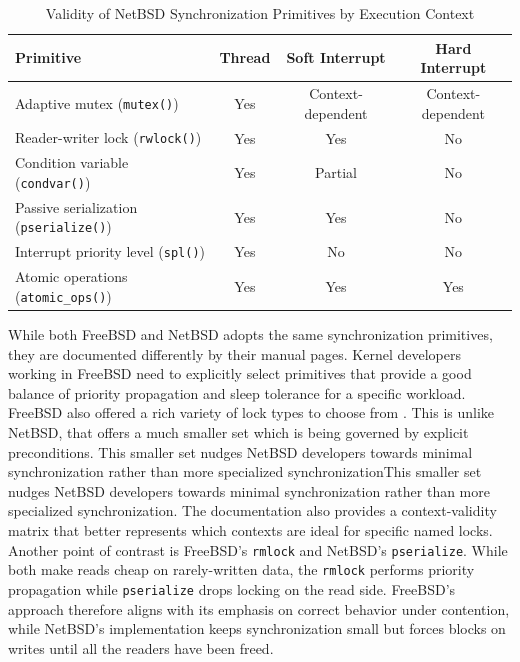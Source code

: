 \begin{table}[!htb]
	\centering
	\begin{tabular}{|p{}|c|c|c|}
		\hline
		\textbf{Primitive}                            & \textbf{Thread} & \textbf{Soft Interrupt} & \textbf{Hard Interrupt} \\
		\hline\hline
		Adaptive mutex (\texttt{mutex()})             & Yes             & Context-dependent       & Context-dependent       \\ \hline
		Reader-writer lock (\texttt{rwlock()})        & Yes             & Yes                     & No                      \\ \hline
		Condition variable (\texttt{condvar()})       & Yes             & Partial                 & No                      \\ \hline
		Passive serialization (\texttt{pserialize()}) & Yes             & Yes                     & No                      \\ \hline
		Interrupt priority level (\texttt{spl()})     & Yes             & No                      & No                      \\ \hline
		Atomic operations (\texttt{atomic\_ops()})    & Yes             & Yes                     & Yes                     \\ \hline
	\end{tabular}
	\caption{Validity of NetBSD Synchronization Primitives by Execution Context \parencites{netbsd_locking}{netbsd_atomic_ops}}
	\label{netbsd-context-matrix}
\end{table}

While both FreeBSD and NetBSD adopts the same synchronization primitives, they are documented differently by their
manual pages. Kernel developers working in FreeBSD need to explicitly select primitives that provide a good balance
of priority propagation and sleep tolerance for a specific workload. FreeBSD also offered a rich variety of lock types
to choose from \parencite{freebsd_locking}. This is unlike NetBSD, that offers a much smaller set which is being governed
by explicit preconditions. This smaller set nudges NetBSD developers towards minimal synchronization rather than
more specialized synchronizationThis smaller set nudges NetBSD developers towards minimal synchronization rather than
more specialized synchronization. The documentation also provides a context-validity matrix that better represents which
contexts are ideal for specific named locks. Another point of contrast is FreeBSD's \texttt{rmlock} and NetBSD's
\texttt{pserialize}. While both make reads cheap on rarely-written data, the \texttt{rmlock} performs priority propagation
while \texttt{pserialize} drops locking on the read side. FreeBSD's approach therefore aligns with its emphasis on
correct behavior under contention, while NetBSD's implementation keeps synchronization small but forces
blocks on writes until all the readers have been freed.

